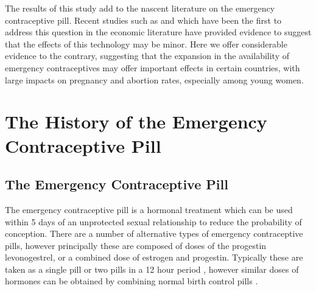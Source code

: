 The results of this study add to the nascent literature on the emergency 
contraceptive pill.  Recent studies such as \citet{Grossetal2014} and 
\citet{Durrance2013} which have been the first to address this question in 
the economic literature have provided evidence to suggest that the effects of 
this technology may be minor.  Here we offer considerable evidence to the 
contrary, suggesting that the expansion in the availability of emergency 
contraceptives may offer important effects in certain countries, with large 
impacts on pregnancy and abortion rates, especially among young women.

  
\section{The History of the Emergency Contraceptive Pill}
\label{TEENscn:background}
\vspace{-5mm}
\subsection{The Emergency Contraceptive Pill}
The emergency contraceptive pill is a hormonal treatment which can be used 
within 5 days of an unprotected sexual relationship to reduce the probability
of conception.  There are a number of alternative types of emergency 
contraceptive pills, however principally these are composed of doses of the 
progestin levonogestrel, or a combined dose of estrogen and progestin. 
Typically these are taken as a single pill or two pills in a 12 hour period
\citep{vonHertzenetal2002}, however similar doses of hormones can be obtained 
by combining normal birth control pills \citep{Ellersonetal1998}.  

